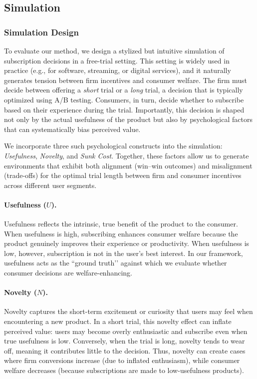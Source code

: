 \documentclass[11pt,letterpaper,english]{article}
\begin{document}
\subsection{Simulation}
\subsubsection{Simulation Design}

To evaluate our method, we design a stylized but intuitive simulation of subscription decisions in a free-trial setting. This setting is widely used in practice (e.g., for software, streaming, or digital services), and it naturally generates tension between firm incentives and consumer welfare. The firm must decide between offering a \emph{short} trial or a \emph{long} trial, a decision that is typically optimized using A/B testing. Consumers, in turn, decide whether to subscribe based on their experience during the trial. Importantly, this decision is shaped not only by the actual usefulness of the product but also by psychological factors that can systematically bias perceived value. 

We incorporate three such psychological constructs into the simulation: \emph{Usefulness}, \emph{Novelty}, and \emph{Sunk Cost}. Together, these factors allow us to generate environments that exhibit both alignment (win--win outcomes) and misalignment (trade-offs) for the optimal trial length between firm and consumer incentives across different user segments.

\paragraph{Usefulness ($U$).} Usefulness reflects the intrinsic, true benefit of the product to the consumer. When usefulness is high, subscribing enhances consumer welfare because the product genuinely improves their experience or productivity. When usefulness is low, however, subscription is not in the user’s best interest. In our framework, usefulness acts as the ``ground truth’’ against which we evaluate whether consumer decisions are welfare-enhancing.

\paragraph{Novelty ($N$).} Novelty captures the short-term excitement or curiosity that users may feel when encountering a new product. In a short trial, this novelty effect can inflate perceived value: users may become overly enthusiastic and subscribe even when true usefulness is low. Conversely, when the trial is long, novelty tends to wear off, meaning it contributes little to the decision. Thus, novelty can create cases where firm conversions increase (due to inflated enthusiasm), while consumer welfare decreases (because subscriptions are made to low-usefulness products).
\end{document}
